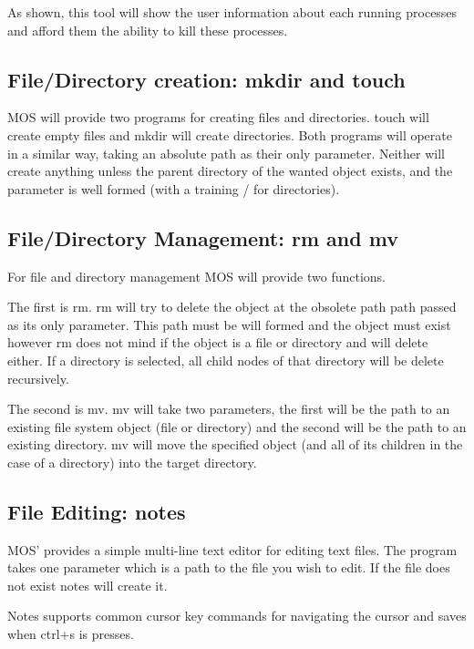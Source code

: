 \documentclass[a4paper]{report}
\begin{document}
As shown, this tool will show the user information about each running processes and afford them the ability to kill these processes.

\subsection{File/Directory creation: mkdir and touch}

MOS will provide two programs for creating files and directories. touch will create empty files and mkdir will create directories. Both programs will operate in a similar way, taking an absolute path as their only parameter. Neither will create anything unless the parent directory of the wanted object exists, and the parameter is well formed (with a training / for directories).

\subsection{File/Directory Management: rm and mv}

For file and directory management MOS will provide two functions.

The first is rm. rm will try to delete the object at the obsolete path path passed as its only parameter. This path must be will formed and the object must exist however rm does not mind if the object is a file or directory and will delete either. If a directory is selected, all child nodes of that directory will be delete recursively.

The second is mv. mv will take two parameters, the first will be the path to an existing file system object (file or directory) and the second will be the path to an existing directory. mv will move the specified object (and all of its children in the case of a directory) into the target directory.

\subsection{File Editing: notes}

MOS' provides a simple multi-line text editor for editing text files. The program takes one parameter which is a path to the file you wish to edit. If the file does not exist notes will create it.

Notes supports common cursor key commands for navigating the cursor and saves when ctrl+s is presses.
\end{document}
